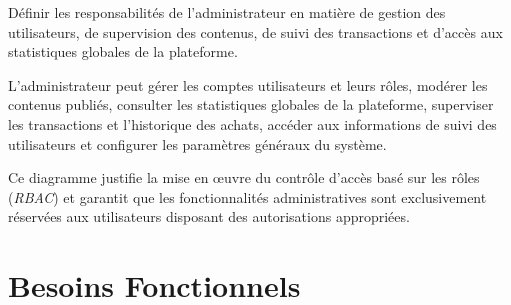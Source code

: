 \medskip

\noindent  Définir les responsabilités de l'administrateur en matière de gestion des utilisateurs, de supervision des contenus, de suivi des transactions et d'accès aux statistiques globales de la plateforme.

\medskip

\noindent  L'administrateur peut gérer les comptes utilisateurs et leurs rôles, modérer les contenus publiés, consulter les statistiques globales de la plateforme, superviser les transactions et l'historique des achats, accéder aux informations de suivi des utilisateurs et configurer les paramètres généraux du système.

\medskip

\noindent  Ce diagramme justifie la mise en œuvre du contrôle d'accès basé sur les rôles (\textit{RBAC}) et garantit que les fonctionnalités administratives sont exclusivement réservées aux utilisateurs disposant des autorisations appropriées.



\section{Besoins Fonctionnels}

